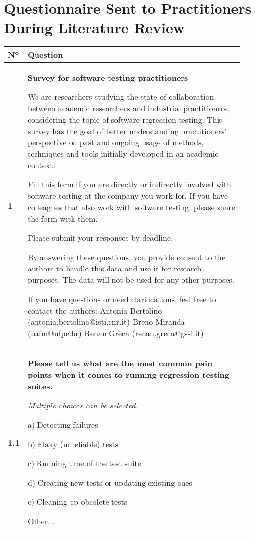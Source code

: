 \section{Questionnaire Sent to Practitioners During Literature Review}
\label{sec:app_prac_questionnaire}

\begin{table}[]
\centering
\small
{}
\begin{tabular}{p{0.05\linewidth}p{0.9\linewidth}}
\toprule
\textbf{Nº} & \textbf{Question} \\
\midrule
\textbf{1} & \textbf{Survey for software testing practitioners}

We are researchers studying the state of collaboration between academic researchers and industrial practitioners, considering the topic of software regression testing. This survey has the goal of better understanding practitioners' perspective on past and ongoing usage of methods, techniques and tools initially developed in an academic context.

Fill this form if you are directly or indirectly involved with software testing at the company you work for. If you have colleagues that also work with software testing, please share the form with them.

Please submit your responses by {{deadline}}.

By answering these questions, you provide consent to the authors to handle this data and use it for research purposes. The data will not be used for any other purposes.

If you have questions or need clarifications, feel free to contact the authors:
Antonia Bertolino (antonia.bertolino@isti.cnr.it)
Breno Miranda (bafm@ufpe.br)
Renan Greca (renan.greca@gssi.it) \\

\textbf{1.1} & \textbf{Please tell us what are the most common pain points when it comes to running regression testing suites.}

\textit{Multiple choices can be selected.}

a) Detecting failures

b) Flaky (unreliable) tests 

c) Running time of the test suite

d) Creating new tests or updating existing ones

e) Cleaning up obsolete tests 

Other... \\


\end{tabular}
\end{table}
